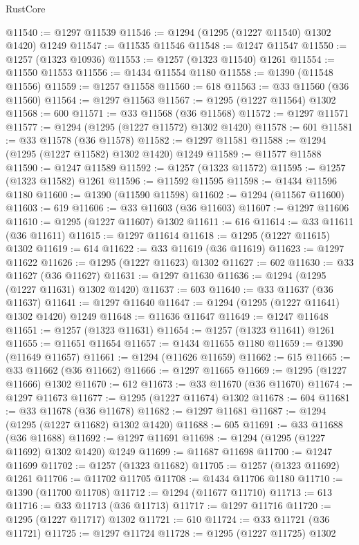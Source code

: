 \begin{lexlean}{RustCore}
\begin{coremodule}
@11540 := @1297 @11539
@11546 := @1294 (@1295 (@1227 @11540) @1302 @1420) @1249
@11547 := @11535 @11546
@11548 := @1247 @11547
@11550 := @1257 (@1323 @10936)
@11553 := @1257 (@1323 @11540) @1261
@11554 := @11550 @11553
@11556 := @1434 @11554 @1180
@11558 := @1390 (@11548 @11556)
@11559 := @1257 @11558
@11560 := 618
@11563 := @33 @11560 (@36 @11560)
@11564 := @1297 @11563
@11567 := @1295 (@1227 @11564) @1302
@11568 := 600
@11571 := @33 @11568 (@36 @11568)
@11572 := @1297 @11571
@11577 := @1294 (@1295 (@1227 @11572) @1302 @1420)
@11578 := 601
@11581 := @33 @11578 (@36 @11578)
@11582 := @1297 @11581
@11588 := @1294 (@1295 (@1227 @11582) @1302 @1420) @1249
@11589 := @11577 @11588
@11590 := @1247 @11589
@11592 := @1257 (@1323 @11572)
@11595 := @1257 (@1323 @11582) @1261
@11596 := @11592 @11595
@11598 := @1434 @11596 @1180
@11600 := @1390 (@11590 @11598)
@11602 := @1294 (@11567 @11600)
@11603 := 619
@11606 := @33 @11603 (@36 @11603)
@11607 := @1297 @11606
@11610 := @1295 (@1227 @11607) @1302
@11611 := 616
@11614 := @33 @11611 (@36 @11611)
@11615 := @1297 @11614
@11618 := @1295 (@1227 @11615) @1302
@11619 := 614
@11622 := @33 @11619 (@36 @11619)
@11623 := @1297 @11622
@11626 := @1295 (@1227 @11623) @1302
@11627 := 602
@11630 := @33 @11627 (@36 @11627)
@11631 := @1297 @11630
@11636 := @1294 (@1295 (@1227 @11631) @1302 @1420)
@11637 := 603
@11640 := @33 @11637 (@36 @11637)
@11641 := @1297 @11640
@11647 := @1294 (@1295 (@1227 @11641) @1302 @1420) @1249
@11648 := @11636 @11647
@11649 := @1247 @11648
@11651 := @1257 (@1323 @11631)
@11654 := @1257 (@1323 @11641) @1261
@11655 := @11651 @11654
@11657 := @1434 @11655 @1180
@11659 := @1390 (@11649 @11657)
@11661 := @1294 (@11626 @11659)
@11662 := 615
@11665 := @33 @11662 (@36 @11662)
@11666 := @1297 @11665
@11669 := @1295 (@1227 @11666) @1302
@11670 := 612
@11673 := @33 @11670 (@36 @11670)
@11674 := @1297 @11673
@11677 := @1295 (@1227 @11674) @1302
@11678 := 604
@11681 := @33 @11678 (@36 @11678)
@11682 := @1297 @11681
@11687 := @1294 (@1295 (@1227 @11682) @1302 @1420)
@11688 := 605
@11691 := @33 @11688 (@36 @11688)
@11692 := @1297 @11691
@11698 := @1294 (@1295 (@1227 @11692) @1302 @1420) @1249
@11699 := @11687 @11698
@11700 := @1247 @11699
@11702 := @1257 (@1323 @11682)
@11705 := @1257 (@1323 @11692) @1261
@11706 := @11702 @11705
@11708 := @1434 @11706 @1180
@11710 := @1390 (@11700 @11708)
@11712 := @1294 (@11677 @11710)
@11713 := 613
@11716 := @33 @11713 (@36 @11713)
@11717 := @1297 @11716
@11720 := @1295 (@1227 @11717) @1302
@11721 := 610
@11724 := @33 @11721 (@36 @11721)
@11725 := @1297 @11724
@11728 := @1295 (@1227 @11725) @1302

\end{coremodule}
\end{lexlean}
